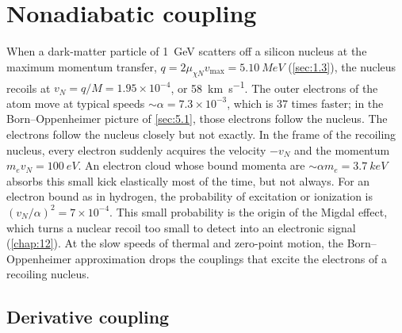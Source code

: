 \section{Nonadiabatic coupling}\label{sec:6.1}

When a dark-matter particle of \SI{1}{GeV} scatters off a silicon nucleus at the maximum momentum transfer, $q = 2\mu_{\chi N}v_{\mathrm{max}} = \SI{5.10}{MeV}$ (\cref{sec:1.3}), the nucleus recoils at $v_N = q/M = 1.95\times10^{-4}$, or \SI{58}{km.s^{-1}}. The outer electrons of the atom move at typical speeds $\sim\alpha = 7.3\times10^{-3}$, which is 37 times faster; in the Born--Oppenheimer picture of \cref{sec:5.1}, those electrons follow the nucleus. The electrons follow the nucleus closely but not exactly. In the frame of the recoiling nucleus, every electron suddenly acquires the velocity $-v_N$ and the momentum $m_ev_N = \SI{100}{eV}$. An electron cloud whose bound momenta are $\sim\alpha m_e = \SI{3.7}{keV}$ absorbs this small kick elastically most of the time, but not always. For an electron bound as in hydrogen, the probability of excitation or ionization is $(v_N/\alpha)^2 = 7\times10^{-4}$. This small probability is the origin of the Migdal effect, which turns a nuclear recoil too small to detect into an electronic signal (\cref{chap:12}). At the slow speeds of thermal and zero-point motion, the Born--Oppenheimer approximation drops the couplings that excite the electrons of a recoiling nucleus.

\subsection{Derivative coupling}


